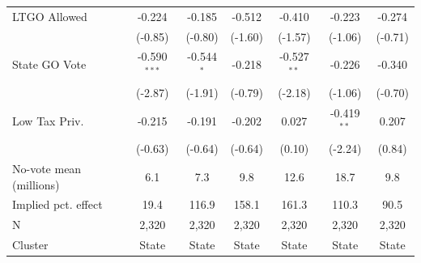 \begin{tabular*}{\textwidth}{@{\extracolsep{\fill}}lcccccc}
   LTGO Allowed               & -0.224         & -0.185        & -0.512        & -0.410        & -0.223         & -0.274\\   
                              & (-0.85)       & (-0.80)      & (-1.60)      & (-1.57)      & (-1.06)       & (-0.71)\\   
   State GO Vote              & -0.590$^{***}$ & -0.544$^{*}$  & -0.218        & -0.527$^{**}$ & -0.226         & -0.340\\   
                              & (-2.87)       & (-1.91)      & (-0.79)      & (-2.18)      & (-1.06)       & (-0.70)\\   
   Low Tax Priv.              & -0.215         & -0.191        & -0.202        & 0.027         & -0.419$^{**}$  & 0.207\\   
                              & (-0.63)       & (-0.64)      & (-0.64)      & (0.10)       & (-2.24)       & (0.84)\\   
   No-vote mean (millions)    & 6.1            & 7.3           & 9.8           & 12.6          & 18.7           & 9.8\\  
   Implied pct. effect        & 19.4           & 116.9         & 158.1         & 161.3         & 110.3          & 90.5\\  
   \hline
   N               & 2,320          & 2,320         & 2,320         & 2,320         & 2,320          & 2,320\\  
   Cluster              & State & State & State & State & State & State\\  
   \bottomrule
\end{tabular*}
\par\endgroup
